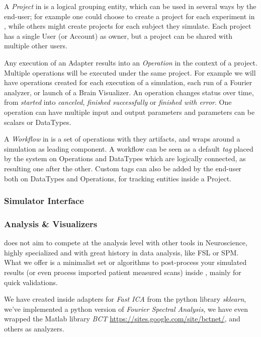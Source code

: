 A \emph{Project} in \TVB is a logical grouping entity, which  can be used in several ways by the end-user; 
for example one could choose to create a project for each experiment in \TVB, while others might create projects for each subject they simulate.
Each project has a single User (or Account) as owner, but a project can be shared with multiple other users.

Any execution of an Adapter results into an \emph{Operation} in the context of a project. Multiple operations will be executed under the same project.
For example we will have operations created for each execution of a simulation, each run of a Fourier analyzer, or launch of a Brain Visualizer.
An operation changes status over time, from \emph{started} into \emph{canceled}, \emph{finished successfully} or \emph{finished with error}.
One operation can have multiple input and output parameters and parameters can be scalars or DataTypes.

A \emph{Workflow} in \TVB is a set of operations with they artifacts, and wraps around a simulation as leading component.
A workflow can be seen as a default \emph{tag} placed by the system on Operations and DataTypes 
which are logically connected, as resulting one after the other.
Custom tags can also be added by the end-user both on DataTypes and Operations, for tracking entities inside a Project.

	\subsubsection{Simulator Interface}
	
	
	\subsubsection{Analysis \& Visualizers}

\TVB does not aim to compete at the analysis level with other tools in Neuroscience, 
highly specialized and with great history in data analysis, like  FSL or SPM. 
What we offer is a minimalist set or algorithms to post-process your 
simulated results (or even process imported patient measured scans) inside \TVB, mainly for quick validations.

We have created inside \TVB adapters for \emph{Fast ICA} from the python library \emph{sklearn}, 
we've implemented a python version of \emph{Fourier Spectral Analysis}, 
we have even wrapped the Matlab library \emph{BCT} \url{https://sites.google.com/site/bctnet/}, and others as analyzers.

